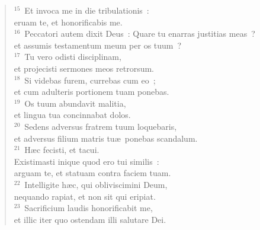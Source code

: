\begin{flushleft}
\begin{verse}
${}^{15}$~Et invoca me in die tribulationis~:\\ eruam te, et honorificabis me.\\
${}^{16}$~Peccatori autem dixit Deus~: Quare tu enarras justitias meas~?\\ et assumis testamentum meum per os tuum~?\\
${}^{17}$~Tu vero odisti disciplinam,\\ et projecisti sermones meos retrorsum.\\
${}^{18}$~Si videbas furem, currebas cum eo~;\\ et cum adulteris portionem tuam ponebas.\\
${}^{19}$~Os tuum abundavit malitia,\\ et lingua tua concinnabat dolos.\\
${}^{20}$~Sedens adversus fratrem tuum loquebaris,\\ et adversus filium matris tu\ae\ ponebas scandalum.\\
${}^{21}$~H\ae c fecisti, et tacui.\\ Existimasti inique quod ero tui similis~:\\ arguam te, et statuam contra faciem tuam.\\
${}^{22}$~Intelligite h\ae c, qui obliviscimini Deum,\\ nequando rapiat, et non sit qui eripiat.\\
${}^{23}$~Sacrificium laudis honorificabit me,\\ et illic iter quo ostendam illi salutare Dei.\end{verse}\end{flushleft}


